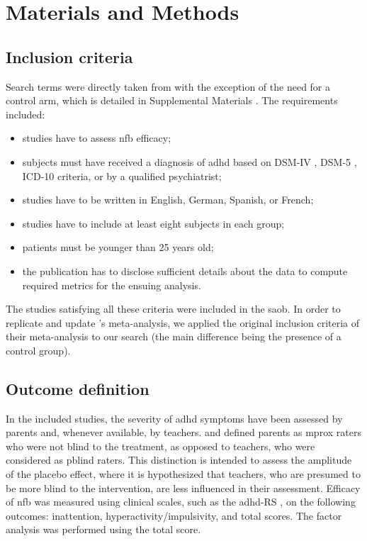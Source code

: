 

\section{Materials and Methods}

\subsection{Inclusion criteria}

Search terms were directly taken from \citet{Cortese2016} with the exception of the need for a control arm, 
which is detailed in Supplemental Materials \citep{Supplementalmaterial}. The requirements included:
\begin{itemize}
	\item studies have to assess \gls{nfb} efficacy; 
	\item subjects must have received a diagnosis of \gls{adhd} based on DSM-IV \citep{DSM-4}, DSM-5 \citep{DSM-5}, 
	ICD-10 \citep{ICD101993} criteria, or by a qualified psychiatrist; 
	\item studies have to be written in English, German, Spanish, or French;
	\item studies have to include at least eight subjects in each group;
	\item patients must be younger than 25 years old;
  \item the publication has to disclose sufficient details about the data
	to compute required metrics for the ensuing analysis.
\end{itemize} 
The studies satisfying all these criteria were included in the \gls{saob}.
In order to replicate and update \citeauthor{Cortese2016}'s meta-analysis, we applied the original inclusion criteria of 
their meta-analysis to our search (the main difference being the presence of a control group). 

\subsection{Outcome definition} 

In the included studies, the severity of \gls{adhd} symptoms have been assessed by parents and, whenever available, 
by teachers. \citet{Cortese2016} and \citet{Micoulaud2014} defined parents as \gls{mprox} raters who were 
not blind to the treatment, as opposed to teachers, who were considered as \gls{pblind} raters. 
This distinction is intended to assess the amplitude of the placebo effect, where it is hypothesized that teachers, 
who are presumed to be more blind to the intervention, are less influenced in their assessment. 
Efficacy of \gls{nfb} was measured using clinical scales, such as the \gls{adhd}-RS \citep{Pappas2006}, 
on the following outcomes: inattention, hyperactivity/impulsivity, and total scores. The factor analysis was 
performed using the total score.

